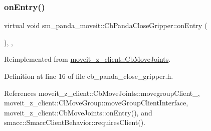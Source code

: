 \subsubsection{\texorpdfstring{on\+Entry()}{onEntry()}}
{\footnotesize\ttfamily virtual void sm\+\_\+panda\+\_\+moveit\+::\+Cb\+Panda\+Close\+Gripper\+::on\+Entry (\begin{DoxyParamCaption}{ }\end{DoxyParamCaption})\hspace{0.3cm}{\ttfamily [inline]}, {\ttfamily [override]}, {\ttfamily [virtual]}}



Reimplemented from \hyperlink{classmoveit__z__client_1_1CbMoveJoints_a512e97e94ab05ee12837433e5d921095}{moveit\+\_\+z\+\_\+client\+::\+Cb\+Move\+Joints}.



Definition at line 16 of file cb\+\_\+panda\+\_\+close\+\_\+gripper.\+h.



References moveit\+\_\+z\+\_\+client\+::\+Cb\+Move\+Joints\+::movegroup\+Client\+\_\+, moveit\+\_\+z\+\_\+client\+::\+Cl\+Move\+Group\+::move\+Group\+Client\+Interface, moveit\+\_\+z\+\_\+client\+::\+Cb\+Move\+Joints\+::on\+Entry(), and smacc\+::\+Smacc\+Client\+Behavior\+::requires\+Client().


